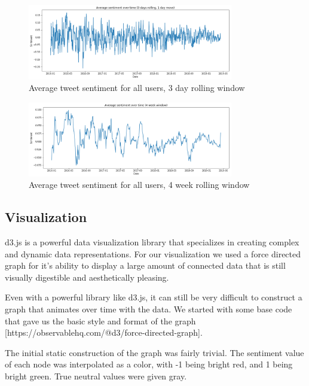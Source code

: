 \documentclass[12pt]{article}
\begin{document}
\begin{figure}[h!]
    \centering
     \includegraphics[width=0.8\textwidth]{avg_sentiment_over_time_big__3day}
        \caption{Average tweet sentiment for all users, 3 day rolling window}
\end{figure}

\begin{figure}[h!]
    \centering
     \includegraphics[width=0.8\textwidth]{avg_sentiment_over_time_big_4week}
        \caption{Average tweet sentiment for all users, 4 week rolling window}
\end{figure}

\subsection{Visualization}

d3.js is a powerful data visualization library that specializes in creating complex and dynamic data representations.
For our visualization we used a force directed graph for it's ability to display a large amount of connected data that is still
visually digestible and aesthetically pleasing.

Even with a powerful library like d3.js, it can still be very difficult to construct a graph that animates over time with the data.
We started with some base code that gave us the basic style and format of the graph [https://observablehq.com/@d3/force-directed-graph].

The initial static construction of the graph was fairly trivial. The sentiment value of each node was interpolated as a color, with -1
being bright red, and 1 being bright green. True neutral values were given gray.
\end{document}

